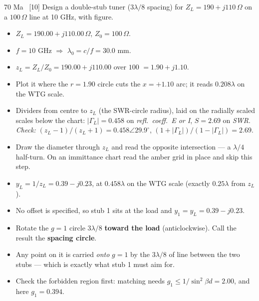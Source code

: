 \begin{asked}{70 Ma \ [10]}
Design a double-stub tuner ($3\lambda/8$ spacing) for $Z_L = 190+j110\,\Omega$ on a $100\,\Omega$ line at 10 GHz, with figure.
\end{asked}
\begin{itemize}
  \item $Z_L = 190.00 + j110.00\,\Omega$, $Z_0 = 100\,\Omega$.
  \item $f = 10\text{ GHz}$ $\Rightarrow$ $\lambda_0 = c/f = 30.0\text{ mm}$.
\end{itemize}
\begin{itemize}
  \item $z_L = Z_L/Z_0 = 190.00 + j110.00$ over $100$ $=1.90 + j1.10$.
  \item Plot it where the $r = 1.90$ circle cuts the $x = +1.10$ arc; it reads $0.208\lambda$ on the WTG scale.
  \item Dividers from centre to $z_L$ (the SWR-circle radius), laid on the radially scaled scales below the chart: $|\Gamma_L| = 0.458$ on \emph{refl.\ coeff.\ E or I}, $S = 2.69$ on \emph{SWR}. \textit{Check:} $(z_L-1)/(z_L+1) = 0.458\angle 29.9^\circ$, $(1+|\Gamma_L|)/(1-|\Gamma_L|) = 2.69$.
\end{itemize}
\begin{itemize}
  \item Draw the diameter through $z_L$ and read the opposite intersection --- a $\lambda/4$ half-turn. On an immittance chart read the amber grid in place and skip this step.
  \item $y_L = 1/z_L = 0.39 - j0.23$, at $0.458\lambda$ on the WTG scale (exactly $0.25\lambda$ from $z_L$).
\end{itemize}
\begin{itemize}
  \item No offset is specified, so stub 1 sits at the load and $y_1 = y_L = 0.39 - j0.23$.
\end{itemize}
\begin{itemize}
  \item Rotate the $g=1$ circle $3\lambda/8$ \textbf{toward the load} (anticlockwise). Call the result the \textbf{spacing circle}.
  \item Any point on it is carried \emph{onto} $g=1$ by the $3\lambda/8$ of line between the two stubs --- which is exactly what stub 1 must aim for.
  \item Check the forbidden region first: matching needs $g_1 \le 1/\sin^2\beta d = 2.00$, and here $g_1 = 0.394$. \checkmark
\end{itemize}
